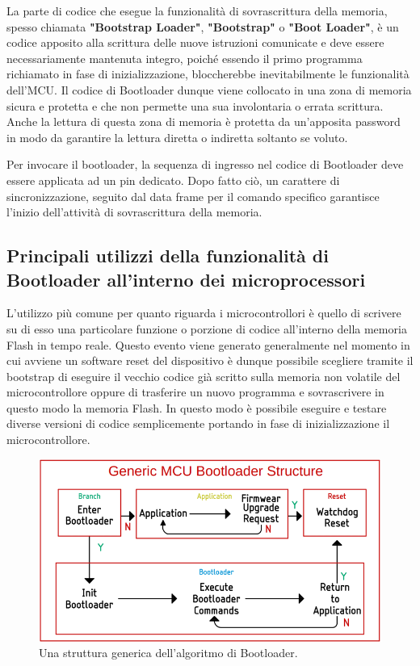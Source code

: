 \documentclass[LaM,binding=0.6cm,oneside]{../sapthesis}
\begin{document}
La parte di codice che esegue la funzionalità di sovrascrittura della memoria, spesso chiamata  \textbf{"Bootstrap Loader"},  \textbf{"Bootstrap"} o  \textbf{"Boot Loader"}, è un codice apposito alla scrittura delle nuove istruzioni comunicate e deve essere necessariamente mantenuta integro, poiché essendo il primo programma richiamato in fase di inizializzazione, bloccherebbe inevitabilmente le funzionalità dell'MCU. Il codice di Bootloader dunque viene collocato in una zona di memoria sicura e protetta e che non permette una sua involontaria o errata scrittura. Anche la lettura di questa zona di memoria è protetta da un'apposita password in modo da garantire la lettura diretta o indiretta soltanto se voluto.

Per invocare il bootloader, la sequenza di ingresso nel codice di Bootloader deve essere applicata ad un pin dedicato. Dopo fatto ciò, un carattere di sincronizzazione, seguito dal data frame per il comando specifico garantisce l’inizio dell’attività di sovrascrittura della memoria.


\subsection{Principali utilizzi della funzionalità di Bootloader all'interno dei microprocessori}
L'utilizzo più comune per quanto riguarda i microcontrollori è quello di scrivere su di esso una particolare funzione o porzione di codice all'interno della memoria Flash in tempo reale.
Questo evento viene generato generalmente nel momento in cui avviene un software reset del dispositivo è dunque possibile scegliere tramite il bootstrap di eseguire il vecchio codice già scritto sulla memoria non volatile del microcontrollore oppure di trasferire un nuovo programma e sovrascrivere in questo modo la memoria Flash. In questo modo è possibile eseguire e testare diverse versioni di codice semplicemente portando in fase di inizializzazione il microcontrollore.

\begin{figure}[htbp]
\centerline{\includegraphics[scale=.33]{examples/Bootloader-System.png}}
\caption{Una struttura generica dell'algoritmo di Bootloader.}
\label{fig}
\end{figure}
\newline
\end{document}
